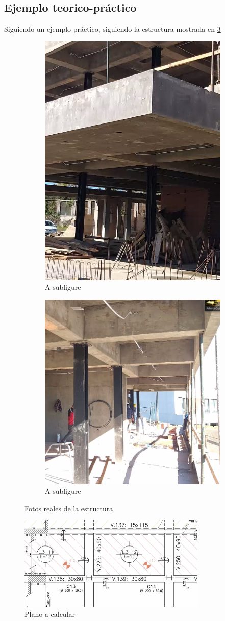 \documentclass[../main.tex]{subfiles}
\begin{document}
\clearpage

\subsection{Ejemplo teorico-práctico}

Siguiendo un ejemplo práctico, siguiendo la estructura mostrada en \cref{fig:real}

\begin{figure}[ht]
\centering
\begin{subfigure}{.5\textwidth}
  \centering
  \includegraphics[width=.4\linewidth]{../images/20210426/ej1}
  \caption{A subfigure}
  \label{fig:sub1}
\end{subfigure}%
\begin{subfigure}{.5\textwidth}
  \centering
  \includegraphics[width=.4\linewidth]{../images/20210426/ej2}
  \caption{A subfigure}
  \label{fig:sub2}
\end{subfigure}
\caption{Fotos reales de la estructura}
\label{fig:real}
\end{figure}

\begin{figure}[ht]
  \centering
  \includegraphics[width=0.8\textwidth]{../images/20210426/plano}
  \caption{Plano a calcular}
  \label{fig:plano}
\end{figure}
\end{document}
